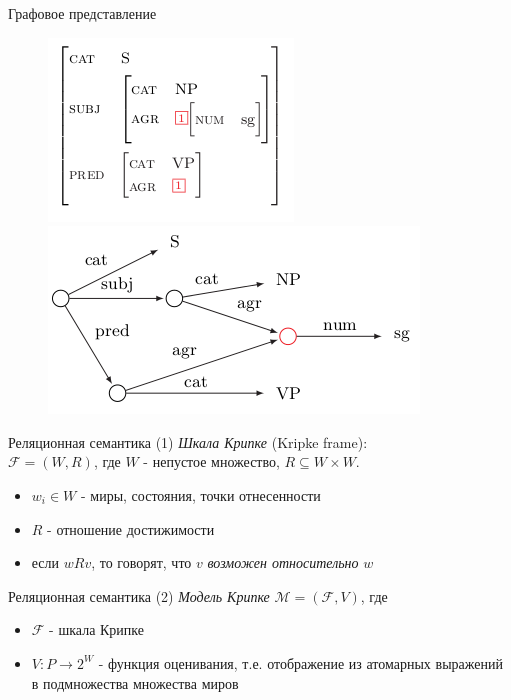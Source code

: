 \documentclass{beamer}
\begin{document}
\begin{frame}{Графовое представление}
\begin{center}
	\begin{figure}[H]
		\includegraphics[scale=0.5]{tfs_avm.png} 
		\includegraphics[scale=0.5]{tfs_graph.png} 
	\end{figure}
\end{center}
\end{frame}


\begin{frame}{Реляционная семантика (1)}
\textit{Шкала Крипке} (Kripke frame):\\
\bigskip
$\mathcal{F} = (W, R)$, где $W$ - непустое множество, $R \subseteq W \times W$.\\
\bigskip
\begin{itemize}
  \item $w_i \in W$ - миры, состояния, точки отнесенности
  \item $R$ - отношение достижимости
  \item если $wRv$, то говорят, что $v$ \textit{возможен относительно} $w$
\end{itemize}
\end{frame}

\begin{frame}{Реляционная семантика (2)}
\textit{Модель Крипке} $\mathcal{M} = (\mathcal{F}, V)$, где  
\bigskip
\begin{itemize}
  \item $\mathcal{F}$ - шкала Крипке
  \item $V : P \to 2^W$ - функция оценивания, т.е. отображение из атомарных выражений в подмножества множества миров
\end{itemize}
\bigskip
\end{frame}
\end{document}
